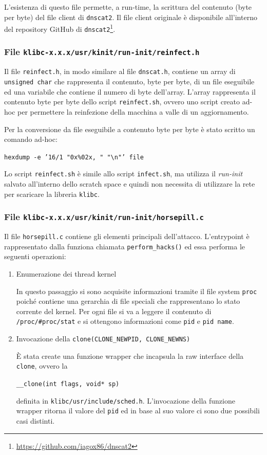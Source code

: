 \documentclass[oneside]{article}
\begin{document}
L'esistenza di questo file permette, a run-time, la scrittura del contenuto (byte per byte) del file client di \texttt{dnscat2}. Il file client originale è disponibile all'interno del repository GitHub di \texttt{dnscat2}\footnote{\url{https://github.com/iagox86/dnscat2}}.

\subsubsection{File \texttt{klibc-x.x.x/usr/kinit/run-init/reinfect.h}}
Il file \texttt{reinfect.h}, in modo similare al file \texttt{dnscat.h}, contiene un array di \texttt{unsigned char} che rappresenta il contenuto, byte per byte, di un file eseguibile ed una variabile che contiene il numero di byte dell'array. L'array rappresenta il contenuto byte per byte dello script \texttt{reinfect.sh}, ovvero uno script creato ad-hoc per permettere la reinfezione della macchina a valle di un aggiornamento.

Per la conversione da file eseguibile a contenuto byte per byte è stato scritto un comando ad-hoc:
\begin{tcolorbox}
\texttt{hexdump -e '16/1 "0x\%02x, " "\textbackslash n"' file}
\end{tcolorbox}

Lo script \texttt{reinfect.sh} è simile allo script \texttt{infect.sh}, ma utilizza il \textit{run-init} salvato all'interno dello scratch space e quindi non necessita di utilizzare la rete per scaricare la libreria \texttt{klibc}.

\subsubsection{File \texttt{klibc-x.x.x/usr/kinit/run-init/horsepill.c}}
Il file \texttt{horsepill.c} contiene gli elementi principali dell'attacco. L'entrypoint è rappresentato dalla funziona chiamata \texttt{perform\_hacks()} ed essa performa le seguenti operazioni:
\begin{enumerate}
\item Enumerazione dei thread kernel

In questo passaggio si sono acquisite informazioni tramite il file system \texttt{proc} poiché contiene una gerarchia di file speciali che rappresentano lo stato corrente del kernel. Per ogni file si va a leggere il contenuto di \texttt{/proc/\#proc/stat} e si ottengono informazioni come \texttt{pid} e \texttt{pid name}.
\item Invocazione della \texttt{clone(CLONE\_NEWPID, CLONE\_NEWNS)}

È stata create una funzione wrapper che incapsula la raw interface della \texttt{clone}, ovvero la 
\begin{center}
\texttt{\_\_clone(int flags, void* sp)} 
\end{center}
definita in \texttt{klibc/usr/include/sched.h}. L'invocazione della funzione wrapper ritorna il valore del \texttt{pid} ed in base al suo valore ci sono due possibili casi distinti.
\end{enumerate}
\end{document}

